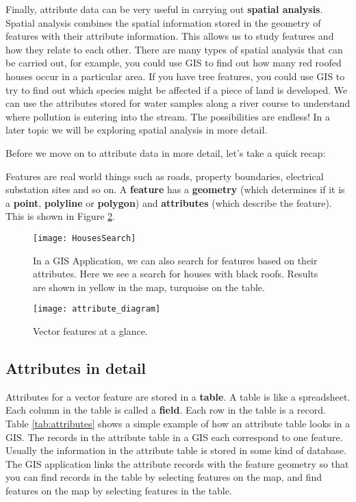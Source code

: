 Finally, attribute data can be very useful in carrying out \textbf{spatial
analysis}.
Spatial analysis combines the spatial information stored in the geometry of
features with their attribute information. This allows us to study features
and how they relate to each other. There are many types of spatial analysis
that can be carried out, for example, you could use GIS to find out how many
red roofed houses occur in a particular area.  If you have tree features, you
could use GIS to try to find out which species might be affected if a piece
of land is developed. We can use the attributes stored for water samples
along a river course to understand where pollution is entering into the
stream. The possibilities are endless! In a later topic we will be exploring
spatial analysis in more detail.

Before we move on to attribute data in more detail, let's take a quick recap:

Features are real world things such as roads, property boundaries, electrical
substation sites and so on. A \textbf{feature} has a \textbf{geometry} (which
determines if it is a \textbf{point}, \textbf{polyline} or \textbf{polygon})
and \textbf{attributes} (which describe the feature).
This is shown in Figure \ref{fig:attdiagram}. 

\begin{figure}[ht]
   \begin{center}
   \caption{In a GIS Application, we can also search for features based on
their attributes. Here we see a search for houses with black roofs. Results
are shown in yellow in the map, turquoise on the table.}
\label{fig:housesearch}\smallskip
   \texttt{[image: HousesSearch]}
\end{center}
\end{figure}


\begin{figure}[ht]
   \begin{center}
   \caption{Vector features at a glance.}
\label{fig:attdiagram}\smallskip
   \texttt{[image: attribute\_diagram]}
\end{center}
\end{figure}

\subsection{Attributes in detail}

Attributes for a vector feature are stored in a \textbf{table}. A table is like a
spreadsheet. Each column in the table is called a \textbf{field}. Each row in the
table is a record. Table \ref{tab:attributes} shows a simple example of how
an attribute
table looks in a GIS. The records in the attribute table in a GIS each
correspond to one feature. Usually the information in the attribute table is
stored in some kind of database. The GIS application links the attribute
records with the feature geometry so that you can find records in the table
by selecting features on the map, and find features on the map by selecting
features in the table.


